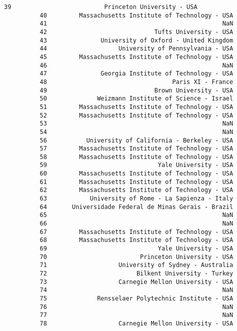 \documentclass[11pt]{article}
\begin{document}
\begin{Verbatim}[commandchars=\\\{\}]
          39                          Princeton University - USA   
          40         Massachusetts Institute of Technology - USA   
          41                                                 NaN   
          42                              Tufts University - USA   
          43               University of Oxford - United Kingdom   
          44                    University of Pennsylvania - USA   
          45         Massachusetts Institute of Technology - USA   
          46                                                 NaN   
          47               Georgia Institute of Technology - USA   
          48                                   Paris XI - France   
          49                              Brown University - USA   
          50              Weizmann Institute of Science - Israel   
          51         Massachusetts Institute of Technology - USA   
          52         Massachusetts Institute of Technology - USA   
          53                                                 NaN   
          54                                                 NaN   
          56           University of California - Berkeley - USA   
          57         Massachusetts Institute of Technology - USA   
          58         Massachusetts Institute of Technology - USA   
          59                               Yale University - USA   
          60         Massachusetts Institute of Technology - USA   
          61         Massachusetts Institute of Technology - USA   
          62         Massachusetts Institute of Technology - USA   
          63            University of Rome - La Sapienza - Italy   
          64       Universidade Federal de Minas Gerais - Brazil   
          65                                                 NaN   
          66                                                 NaN   
          67         Massachusetts Institute of Technology - USA   
          68         Massachusetts Institute of Technology - USA   
          69                               Yale University - USA   
          70                          Princeton University - USA   
          71                    University of Sydney - Australia   
          72                         Bilkent University - Turkey   
          73                    Carnegie Mellon University - USA   
          74                                                 NaN   
          75              Rensselaer Polytechnic Institute - USA   
          76                                                 NaN   
          77                                                 NaN   
          78                    Carnegie Mellon University - USA   

\end{Verbatim}
\end{document}

